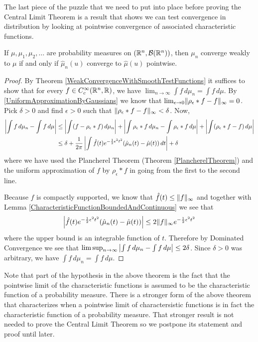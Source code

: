 The last piece of the puzzle that we need to put into place before
proving the Central Limit Theorem is a result that shows we can test
convergence in distribution by looking at pointwise convergence of
associated characteristic functions.
\begin{thm}\label{GlivenkoLevyContinuity}If $\mu, \mu_1, \mu_2, \dots$
  are probability measures on $(\mathbb{R}^n, \mathcal{B}(\mathbb{R}^n))$,
  then $\mu_n$ converge weakly to $\mu$ if and only if $\hat{\mu}_n(u)$
  converge to $\hat{\mu}(u)$ pointwise.
\end{thm}
\begin{proof}
By Theorem \ref{WeakConvergenceWithSmoothTestFunctions} it suffices to
show that for every $f \in C^\infty_c(\mathbb{R}^n, \mathbb{R})$, we have $\lim_{n
  \to \infty} \int f
\, d\mu_n = \int f \, d\mu$.  By \ref{UniformApproximationByGaussians}
we know that $\lim_{\epsilon \to 0}
\lVert \rho_\epsilon * f - f \rVert_\infty = 0$.  Pick $\delta > 0$ and find
$\epsilon > 0$ such that $\lVert \rho_\epsilon * f - f \rVert_\infty <
\delta$.
Now, 
\begin{align*}
\left \vert \int f \, d\mu_n - \int f \, d\mu \right \vert &\leq \left \vert \int (f - \rho_\epsilon * f) \, d\mu_n \right \vert + \left \vert \int \rho_\epsilon * f \, d\mu_n -
  \int \rho_\epsilon * f \, d\mu \right \vert + \left \vert \int (\rho_\epsilon * f - f)
  \, d\mu \right \vert \\
&\leq \delta + \frac{1}{2\pi} \left \vert \int \hat{f}(t)
  e^{-\frac{1}{2}\epsilon^2t^2} (\hat{\mu}_n(t) - \hat{\mu}(t)) \, dt \right \vert
+ \delta 
\end{align*}
where we have used the Plancherel Theorem (Theorem
\ref{PlancherelTheorem}) and the uniform
approximation of $f$ by $\rho_\epsilon * f$ in going from the first to
the second line.

Because $f$ is compactly supported, we know that $\hat{f}(t) \leq
\lVert f \rVert_\infty$ and together with Lemma
\ref{CharacteristicFunctionBoundedAndContinuous} we see that 
\begin{align*}
\left \vert \hat{f}(t)
  e^{-\frac{1}{2}\epsilon^2t^2} (\hat{\mu}_n(t) - \hat{\mu}(t)) \right \vert \leq
2\lVert f \rVert_\infty e^{-\frac{1}{2}\epsilon^2t^2}
\end{align*} where the upper bound
is an integrable function of $t$.  Therefore by Dominated Convergence
we see that $\limsup_{n \to \infty} \left \vert \int f \, d\mu_n - \int f \,
  d\mu \right \vert  \leq 2\delta$.  Since $\delta>0$ was arbitrary, we have $\int f \, d\mu_n = \int f \,  d\mu$.
\end{proof}

Note that part of the hypothesis in the above theorem is the fact that
the pointwise limit of the characteristic functions is assumed to be
the characteristic function of a probability measure.  There is a stronger form of the above theorem that
characterizes when a pointwise limit of charactersistic functions is
in fact the characteristic function of a probability measure.  That
stronger result is not needed to prove the Central Limit Theorem so we
postpone its statement and proof until later.

